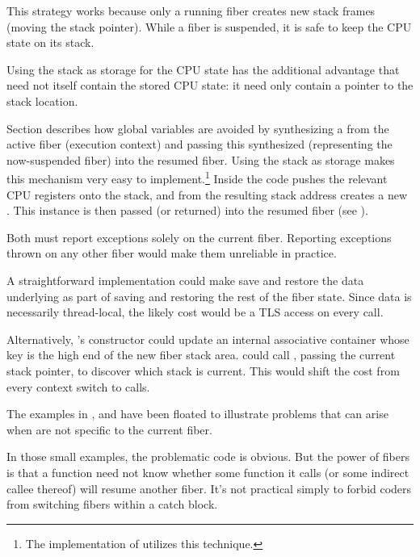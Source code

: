 This strategy works because only a running fiber creates new stack frames
(moving the stack pointer). While a fiber is suspended, it is safe to keep the
CPU state on its stack.

Using the stack as storage for the CPU state has the additional advantage
that \fiber need not itself contain the stored CPU state: it need only contain
a pointer to the stack location.

Section  describes how global variables are avoided
by synthesizing a \fiber from the active fiber (execution context) and passing
this synthesized \fiber (representing the now-suspended fiber) into the resumed
fiber. Using the stack as storage makes this mechanism very easy to
implement.\footnote{The implementation of \bcontext\cite{bcontext} utilizes this
technique.}
Inside \resume the code pushes the relevant CPU registers onto the stack, and
from the resulting stack address creates a new \fiber. This instance is then
passed (or returned) into the resumed fiber (see ).


\abschnitt{\exfns}\label{exc_scope}

Both \exfns must report exceptions solely on the current fiber.
Reporting exceptions thrown on any other fiber would make them
unreliable in practice.

A straightforward implementation could make \allresume save and restore the
data underlying \exfns as part of saving and restoring the rest of the fiber
state. Since \exfns data is necessarily thread-local, the likely cost would be
a TLS access on every \anyresume call.

Alternatively, \fiber's constructor could update an internal associative
container whose key is the high end of the new fiber stack area. \exfns could
call , passing the current stack pointer, to discover
which stack is current. This would shift the cost from every context switch
to \exfns calls.

The examples in ,  and
 have been floated to illustrate problems that can
arise when \exfns are not specific to the current fiber.

In those small examples, the problematic code is obvious. But the power of
fibers is that a function need not know whether some function it calls (or
some indirect callee thereof) will resume another fiber. It's not practical
simply to forbid coders from switching fibers within a catch block.

